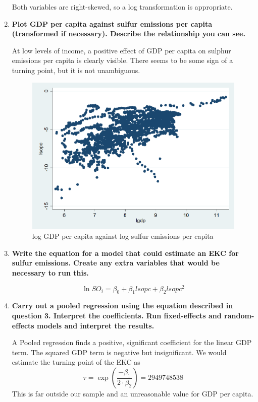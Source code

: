 \documentclass{scrartcl}
\begin{document}
\begin{enumerate}
	Both variables are right-skewed, so a log transformation is appropriate.
	
	\item \textbf{Plot GDP per capita against sulfur emissions per capita (transformed if necessary). Describe the relationship you can see.}

	At low levels of income, a positive effect of GDP per capita on sulphur emissions per capita is clearly visible. There seems to be some sign of a turning point, but it is not unambiguous.
	
	
	
	 \begin{figure}
      \includegraphics[width=12cm]{../stata/lsopc_lgdp.png}
      \caption{log GDP per capita against log sulfur emissions per capita}
    \end{figure}
	
	\item \textbf{Write the equation for a model that could estimate an EKC for sulfur emissions. Create any extra variables that would be necessary to run this.}
	
	\[ \ln{SO_i} = \beta_0 + \beta_1 lsopc + \beta_2 lsopc^2\]
	
	
	\item \textbf{Carry out a pooled regression using the equation described in question 3. Interpret the coefficients. Run fixed-effects and random-effects models and interpret the results.}

	
	
	A Pooled regression finds a positive, significant coefficient for the linear GDP term. The squared GDP term is negative but insignificant. We would estimate the turning point of the EKC as \[ \tau = \exp\left(\frac{-\beta_1}{2\cdot\beta_2}\right) = 2949748538 \] This is far outside our sample and an unreasonable value for GDP per capita.


\end{enumerate}
\end{document}
